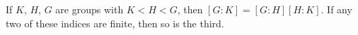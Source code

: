 \begin{theorem}
If $K$, $H$, $G$ are groups with $K < H < G$, then $[G : K] = [G : H][H : K]$. If any two of these indices are finite, then so is the third.
\end{theorem}
